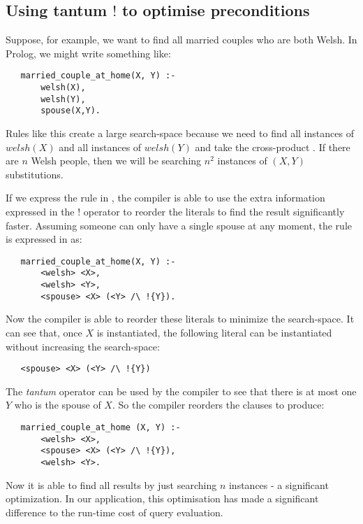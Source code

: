 \subsection{Using tantum $!$  to optimise preconditions}
\label{optimizingpreconditions}
Suppose, for example, we want to find all married couples who are both Welsh.
In Prolog, we might write something like:
\begin{verbatim}
   married_couple_at_home(X, Y) :-
       welsh(X),
       welsh(Y),
       spouse(X,Y).
\end{verbatim}	
Rules like this create a large search-space because we need to find all instances of $welsh(X)$ and all instances of  $welsh(Y)$ and take the cross-product \cite{smith-and-genesereth}. If there are $n$ Welsh people, then we will be searching $n^2$ instances of $(X,Y)$ substitutions.

If we express the rule in \cathoristic{}, the compiler is able to use the extra information expressed in the $!$ operator to reorder the literals to find the result significantly faster.
Assuming someone can only have a single spouse at any moment, the rule is expressed in \cathoristic{} as:
\begin{verbatim}
   married_couple_at_home(X, Y) :-
       <welsh> <X>,
       <welsh> <Y>,
       <spouse> <X> (<Y> /\ !{Y}).
\end{verbatim}	
Now the compiler is able to reorder these literals to minimize the search-space. 
It can see that, once $X$ is instantiated, the following literal can be instantiated without increasing the search-space:
\begin{verbatim}
   <spouse> <X> (<Y> /\ !{Y})
\end{verbatim}
The \emph{tantum} operator can be used by the compiler to see that there is at most one $Y$ who is the spouse of $X$.
So the compiler reorders the clauses to produce:
\begin{verbatim}
   married_couple_at_home (X, Y) :-
       <welsh> <X>,
       <spouse> <X> (<Y> /\ !{Y}),
       <welsh> <Y>.
\end{verbatim}	
Now it is able to find all results by just searching $n$ instances - a significant optimization.
In our application, this optimisation has made a significant difference to the run-time cost of query evaluation.






